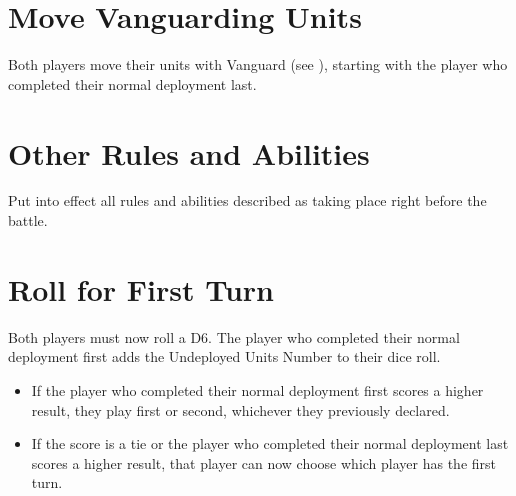 \section{Move Vanguarding Units}

Both players move their units with Vanguard (see ), starting with the player who completed their normal deployment last.

\section{Other Rules and Abilities}
\label{other_rules_and_abilities}

Put into effect all rules and abilities described as taking place right before the battle.

\section{Roll for First Turn}
\label{roll_for_first_turn}

Both players must now roll a D6. The player who completed their normal deployment first adds the Undeployed Units Number to their dice roll.
\begin{itemize}
	\item If the player who completed their normal deployment first scores a higher result, they play first or second, whichever they previously declared.
	\item If the score is a tie or the player who completed their normal deployment last scores a higher result, that player can now choose which player has the first turn.
\end{itemize}

\RBemc
